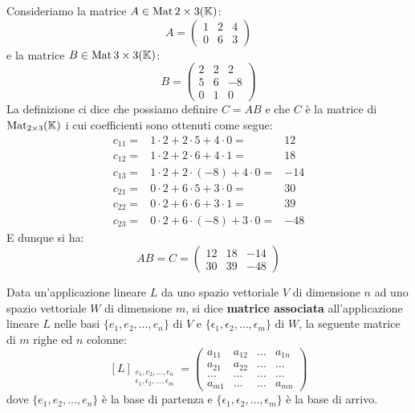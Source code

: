 \begin{example}
	Consideriamo la matrice $A \in \operatorname{Mat}{2 \times 3}(\mathbb{K})$:
	\[
		A = \begin{pmatrix}
			1 & 2 & 4 \\
			0 & 6 & 3
		\end{pmatrix}
	\]
	e la matrice $B \in \operatorname{Mat}{3 \times 3}(\mathbb{K})$:
	\[
		B = \begin{pmatrix}
			2 & 2 & 2  \\
			5 & 6 & -8 \\
			0 & 1 & 0
		\end{pmatrix}
	\]
	La definizione ci dice che possiamo definire $C = AB$ e che $C$ è la matrice di $\operatorname{Mat}_{2 \times 3}(\mathbb{K})$
	i cui coefficienti sono ottenuti come segue:
	\begin{align*}
		c_{11} = & 1 \cdot 2 + 2 \cdot 5 + 4 \cdot 0 =    & 12  \\
		c_{12} = & 1 \cdot 2 + 2 \cdot 6 + 4 \cdot 1 =    & 18  \\
		c_{13} = & 1 \cdot 2 + 2 \cdot (-8) + 4 \cdot 0 = & -14 \\
		c_{21} = & 0 \cdot 2 + 6 \cdot 5 + 3 \cdot 0 =    & 30  \\
		c_{22} = & 0 \cdot 2 + 6 \cdot 6 + 3 \cdot 1 =    & 39  \\
		c_{23} = & 0 \cdot 2 + 6 \cdot (-8) + 3 \cdot 0 = & -48
	\end{align*}
	E dunque si ha:
	\[
		AB = C = \begin{pmatrix}
			12 & 18 & -14 \\
			30 & 39 & -48
		\end{pmatrix}
	\]
\end{example}

\begin{definition}
	Data un'applicazione lineare $L$ da uno spazio vettoriale $V$ di dimensione $n$ ad uno spazio vettoriale
	$W$ di dimensione $m$, si dice \textbf{matrice associata} all'applicazione lineare $L$ nelle basi
	$\{e_1, e_2, \dots, e_n\}$ di $V$ e $\{\epsilon_1, \epsilon_2, \dots, \epsilon_m\}$ di $W$, la seguente
	matrice di $m$ righe ed $n$ colonne:
	\[
		[L]_{\substack{
					e_1, e_2, \dots, e_n\\
					\epsilon_1, \epsilon_2, \dots, \epsilon_m
				}} = \begin{pmatrix}
			a_{11} & a_{12} & \dots & a_{1n} \\
			a_{21} & a_{22} & \dots & \dots  \\
			\dots  & \dots  & \dots & \dots  \\
			a_{m1} & \dots  & \dots & a_{mn}
		\end{pmatrix}
	\]
	dove $\{e_1, e_2, \dots, e_n\}$ è la base di partenza e $\{\epsilon_1, \epsilon_2, \dots, \epsilon_m\}$ è
	la base di arrivo.
\end{definition}

